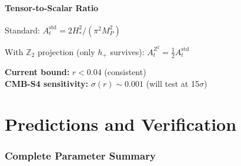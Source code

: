 \documentclass[11pt,a4paper]{article}
\theoremstyle{plain}
\theoremstyle{definition}
\theoremstyle{remark}
\newcommand{\Ztwo}{\mathbb{Z}_2}
\begin{document}
\subsection{Tensor-to-Scalar Ratio}

Standard: $A_t^{\text{std}} = 2H_*^2/(\pi^2 M_P^2)$

With $\Ztwo$ projection (only $h_+$ survives): $A_t^{Z^2} = \frac{1}{2} A_t^{\text{std}}$

\begin{center}
\end{center}

\textbf{Current bound:} $r < 0.04$ (consistent) \\
\textbf{CMB-S4 sensitivity:} $\sigma(r) \sim 0.001$ (will test at 15$\sigma$)

\part{Predictions and Verification}

\section{Complete Parameter Summary}
\end{document}
